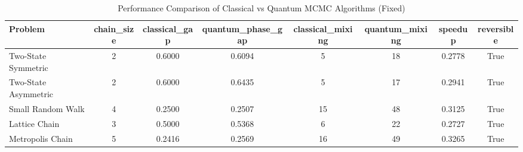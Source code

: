 \begin{table}
\caption{Performance Comparison of Classical vs Quantum MCMC Algorithms (Fixed)}
\label{tab:performance_comparison_fixed}
\begin{tabular}{lccccccc}
\toprule
Problem & chain_size & classical_gap & quantum_phase_gap & classical_mixing & quantum_mixing & speedup & reversible \\
\midrule
Two-State Symmetric & 2 & 0.6000 & 0.6094 & 5 & 18 & 0.2778 & True \\
Two-State Asymmetric & 2 & 0.6000 & 0.6435 & 5 & 17 & 0.2941 & True \\
Small Random Walk & 4 & 0.2500 & 0.2507 & 15 & 48 & 0.3125 & True \\
Lattice Chain & 3 & 0.5000 & 0.5368 & 6 & 22 & 0.2727 & True \\
Metropolis Chain & 5 & 0.2416 & 0.2569 & 16 & 49 & 0.3265 & True \\
\bottomrule
\end{tabular}
\end{table}
